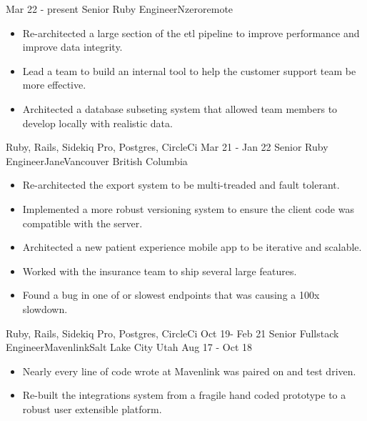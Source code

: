 %
%
%

\begin{experiences}
  \experience
    {Mar 22 - present}   {Senior Ruby Engineer}{Nzero}{remote}
    {} {
        \begin{itemize}
          \item Re-architected a large section of the etl pipeline to improve performance and improve data integrity.
          \item Lead a team to build an internal tool to help the  customer support team be more effective.
          \item Architected a database subseting system that allowed team members to develop locally with realistic data.
        \end{itemize}
      }
      {Ruby, Rails, Sidekiq Pro, Postgres, CircleCi}
  \emptySeparator
  \experience
    {Mar 21 - Jan 22}   {Senior Ruby Engineer}{Jane}{Vancouver British Columbia}
    {} {
        \begin{itemize}
          \item Re-architected the export system to be multi-treaded and fault tolerant. 
          \item Implemented a more robust versioning system to ensure the client code was compatible with the server.
          \item Architected a new patient experience mobile app to be iterative and scalable.
          \item Worked with the insurance team to ship several large features.
          \item Found a bug in one of or slowest endpoints that was causing a 100x slowdown.
        \end{itemize}
      }
      {Ruby, Rails, Sidekiq Pro, Postgres, CircleCi}
  \emptySeparator
  \experience
    {Oct 19- Feb 21} {Senior Fullstack Engineer}{Mavenlink}{Salt Lake City Utah}
    {Aug 17 - Oct 18} {
                      \begin{itemize}
                        \item Nearly every line of code wrote at Mavenlink was paired on and test driven.
                        \item Re-built the integrations system from a fragile hand coded prototype to a robust user extensible platform.

\end{itemize}}
\end{experiences}
